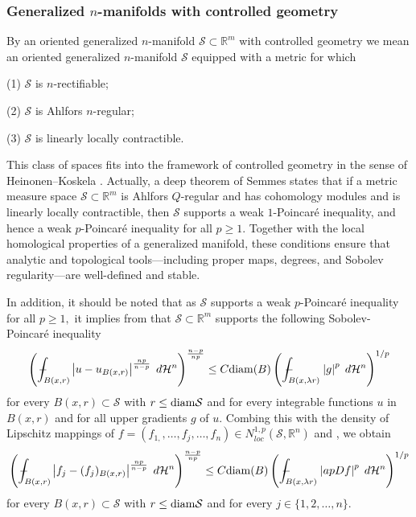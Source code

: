 \documentclass[11pt,twoside]{article}
\theoremstyle{definition}
\theoremstyle{remark}
\newcommand{\abs}[1]{\left|#1\right|}
\begin{document}
 \subsubsection{Generalized $n$-manifolds with controlled geometry}\label{adjhaka}

By an oriented generalized $n$-manifold $\mathcal{S}\subset \mathbb{R}^{m}$  with controlled  geometry we mean an oriented  generalized $n$-manifold $\mathcal{S}$ equipped with a metric for which

(1) $\mathcal{S}$ is $n$-rectifiable;

(2) $\mathcal{S}$ is Ahlfors $n$-regular;

(3) $\mathcal{S}$ is linearly locally contractible.

This class of spaces fits into the framework of controlled geometry in the sense of Heinonen–Koskela \cite{HK98}. Actually,  a deep theorem of Semmes \cite{Sem96} states that if a metric measure space $\mathcal{S}\subset \mathbb{R}^{m}$ is Ahlfors $Q$-regular and  has cohomology modules and is linearly locally contractible, then 
$\mathcal{S}$  supports a weak $1$-Poincar\'{e} inequality, and hence a weak $p$-Poincar\'{e} inequality for all $p\geq1.$ Together with the local homological properties of a generalized manifold, these conditions ensure that analytic and topological tools—including proper maps, degrees, and Sobolev regularity—are well-defined and stable.



In addition, it should be noted that as $\mathcal{S}$  supports  a weak $p$-Poincar\'{e} inequality for all $p\geq1,$   it implies from \cite[Theorem 8.3.2 and Corollary 9.1.36]{HKST15} that $\mathcal{S}\subset \mathbb{R}^{m}$  supports the following Sobolev-Poincar\'{e} inequality
\begin{equation}\label{asddfvddjaadlla}
\left(\int_{ B(x,r)}\!\!\!\!\!\!\!\!\!\!\!\!\!\!\!\!\!\!\!\!\!\; {}-{} \,\;\;\,\,\,\;\;\abs{u-u_{B(x,r)}}^{\frac{np}{n-p}}\;d\mathcal{H}^{n}\right)^{\frac{n-p}{np}}\leq C{\rm diam}(B)
\left(\int_{ B(x,\lambda r)}\!\!\!\!\!\!\!\!\!\!\!\!\!\!\!\!\!\!\!\!\!\!\!\; {}-{} \,\;\,\;\;\,\,\,\;\;\abs{g}^{p}\;d\mathcal{H}^{n}\right)^{1/p}
\end{equation}
for every $B(x,r)\subset \mathcal{S}$ with $r\leq {\rm diam}\mathcal{S}$ and for every integrable functions $u$ in $B(x,r)$ and for all upper gradients $g$ of $u.$ Combing this with the density of Lipschitz 
mappings of $f=(f_{1,},\ldots,f_{j},\ldots,f_{n})\in N_{loc}^{1,p}(\mathcal{S},\mathbb{R}^{n})$ and \cite[Lemma 2.29]{Kir16}, we obtain
\begin{equation}\label{asddfvddjaadlla}
\left(\int_{ B(x,r)}\!\!\!\!\!\!\!\!\!\!\!\!\!\!\!\!\!\!\!\!\!\; {}-{} \,\;\;\,\,\,\;\;\abs{f_{j}-(f_{j})_{B(x,r)}}^{\frac{np}{n-p}}\;d\mathcal{H}^{n}\right)^{\frac{n-p}{np}}\leq C{\rm diam}(B)
\left(\int_{ B(x,\lambda r)}\!\!\!\!\!\!\!\!\!\!\!\!\!\!\!\!\!\!\!\!\!\!\!\; {}-{} \,\;\,\;\;\,\,\,\;\;\abs{apDf}^{p}\;d\mathcal{H}^{n}\right)^{1/p}
\end{equation}
for every $B(x,r)\subset \mathcal{S}$ with $r\leq {\rm diam}\mathcal{S}$ and for every $j\in\{1,2,\ldots,n\}.$
\end{document}
